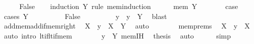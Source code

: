 \begin{isabellebody}
\ \ \isamarkupfalse%
\ \isamarkupfalse%
\ {\isachardoublequoteopen}False{\isachardoublequoteclose}\isanewline
\ \ \isamarkupfalse%
\ {\isacharparenleft}{\kern0pt}induction\ Y\ rule{\isacharcolon}{\kern0pt}\ mem{\isacharunderscore}{\kern0pt}induction{\isacharparenright}{\kern0pt}\isanewline
\ \ \ \ \isamarkupfalse%
\ {\isacharparenleft}{\kern0pt}mem\ Y{\isacharparenright}{\kern0pt}\isanewline
\ \ \ \ \isamarkupfalse%
\ \isamarkupfalse%
\ {\isacharquery}{\kern0pt}case\isanewline
\ \ \ \ \isamarkupfalse%
\ {\isacharparenleft}{\kern0pt}cases\ {\isachardoublequoteopen}Y\ {\isacharequal}{\kern0pt}\ {\isacharbraceleft}{\kern0pt}{\isacharbraceright}{\kern0pt}{\isachardoublequoteclose}{\isacharparenright}{\kern0pt}\isanewline
\ \ \ \ \ \ \isamarkupfalse%
\ False\isanewline
\ \ \ \ \ \ \isamarkupfalse%
\ \isamarkupfalse%
\ y\ \ {\isachardoublequoteopen}y\ {\isasymin}\ Y{\isachardoublequoteclose}\ \isamarkupfalse%
\ blast\isanewline
\ \ \ \ \ \ \isamarkupfalse%
\ add{\isacharunderscore}{\kern0pt}mem{\isacharunderscore}{\kern0pt}add{\isacharunderscore}{\kern0pt}if{\isacharunderscore}{\kern0pt}mem{\isacharunderscore}{\kern0pt}right\ \isamarkupfalse%
\ {\isachardoublequoteopen}X\ {\isacharplus}{\kern0pt}\ y\ {\isasymin}\ X\ {\isacharplus}{\kern0pt}\ Y{\isachardoublequoteclose}\ \isamarkupfalse%
\ auto\isanewline
\ \ \ \ \ \ \isamarkupfalse%
\ mem{\isachardot}{\kern0pt}prems\ \isamarkupfalse%
\ {\isachardoublequoteopen}X\ {\isacharplus}{\kern0pt}\ y\ {\isacharless}{\kern0pt}\ X{\isachardoublequoteclose}\ \isamarkupfalse%
\ {\isacharparenleft}{\kern0pt}auto\ intro{\isacharcolon}{\kern0pt}\ lt{\isacharunderscore}{\kern0pt}if{\isacharunderscore}{\kern0pt}lt{\isacharunderscore}{\kern0pt}if{\isacharunderscore}{\kern0pt}mem{\isacharparenright}{\kern0pt}\isanewline
\ \ \ \ \ \ \isamarkupfalse%
\ {\isacartoucheopen}y\ {\isasymin}\ Y{\isacartoucheclose}\ mem{\isachardot}{\kern0pt}IH\ \isamarkupfalse%
\ {\isacharquery}{\kern0pt}thesis\ \isamarkupfalse%
\ auto\isanewline
\ \ \ \ \isamarkupfalse%
\ simp\isanewline
\ \ \isamarkupfalse%
\isanewline
{}\isamarkupfalse%
%
\endisatagproof
{\isafoldproof}%
%
\isadelimproof
\isanewline
%
\endisadelimproof
\isanewline
{}\isamarkupfalse%

\end{isabellebody}
